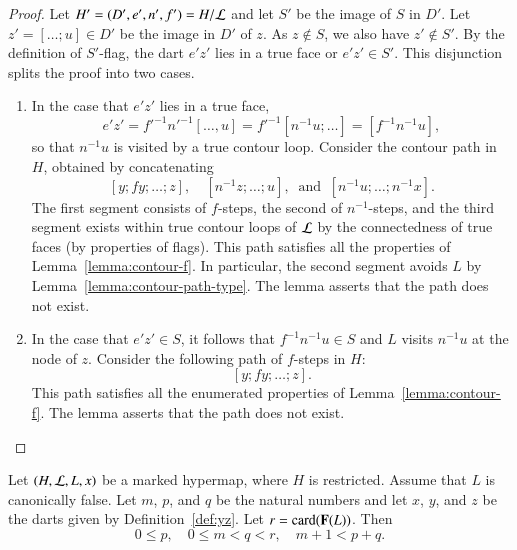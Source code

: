 \begin{proof}
  Let $H' = (D',e',n',f') = H/{\cal L}$ and let $S'$ be the image of
  $S$ in $D'$.  Let $z' = [\ldots;u]\in D'$ be the image in $D'$ of
  $z$.  As $z\not\in S$, we also have $z'\not\in S'$.  By the
  definition of $S'$-flag, the dart $e'z'$ lies in a true face or
  $e'z'\in S'$.  This disjunction splits the proof into two
  cases.
\begin{enumerate}
\item In the case that $e'z'$ lies in a true face, 
\[ 
e'z' = {f'}^{-1} {n'}^{-1} [\ldots,u] = {f'}^{-1} [n^{-1}u;\ldots]=[f^{-1}n^{-1}u],
\] 
so that $n^{-1} u$ is visited by a true contour loop.
Consider the contour
path in $H$, obtained by concatenating
\[ 
[y;fy;\ldots;z],\quad [n^{-1}z;\ldots;u],~\text{ and } ~ [n^{-1} u;\ldots;n^{-1} x].
\] 
The first segment consists of $f$-steps, the second of $n^{-1}$-steps,
and the third segment exists within true contour loops of ${\cal L}$
by the connectedness of true faces (by properties of flags).  This
path satisfies all the properties of Lemma~\ref{lemma:contour-f}.
In particular, the second segment avoids $L$ by Lemma~\ref{lemma:contour-path-type}.  
The lemma asserts that the path does not exist.
\item 
In the case that $e'z'\in S$,  it follows that
$f^{-1}n^{-1}u \in S$ and $L$ visits $n^{-1} u$ at the node of $z$.
Consider the following path of $f$-steps in $H$:
\[ 
[y;f y;\ldots;z].
\] 
This path satisfies all the enumerated properties of
Lemma~\ref{lemma:contour-f}.   The lemma asserts that the path does not exist.
\end{enumerate}
\end{proof}

\begin{lemma}[parameters]\label{lemma:parameters}
Let $(H,{\cal L},L,x)$ be a
marked hypermap, where $H$ is restricted. Assume that $L$ is canonically false.
Let $m$, $p$, and $q$ be the natural numbers and let $x$, $y$, and $z$ be the darts given by
Definition~\ref{def:yz}.  Let $r = {\operatorname{card}}({\mathbf F}(L))$.  Then
\[ 
0\le p,\quad 0\le m < q < r,\quad m+1 < p+q.
\] 
\end{lemma}


